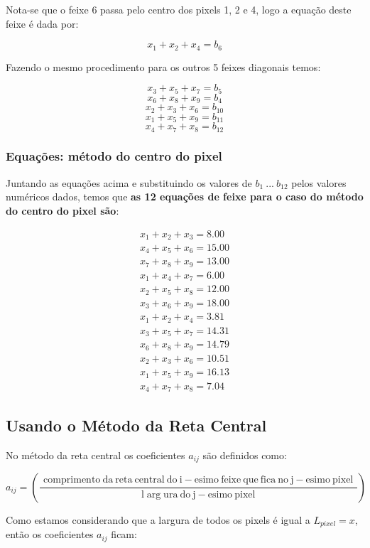 \documentclass[a4paper, 12pt]{article}
\begin{document}
Nota-se que o feixe 6 passa pelo centro dos pixels 1, 2 e 4, logo a equação deste feixe é dada por:

$$x_1+x_2+x_4=b_6$$

Fazendo o mesmo procedimento para os outros 5 feixes diagonais temos:

$$x_3+x_5+x_7=b_5$$
$$x_6+x_8+x_9=b_4$$
$$x_2+x_3+x_6=b_{10}$$
$$x_1+x_5+x_9=b_{11}$$
$$x_4+x_7+x_8=b_{12}$$


\subsubsection{Equações: método do centro do pixel}

Juntando as equações acima e substituindo os valores de $b_1\  ...\  b_{12}$ pelos valores numéricos dados, temos que \textbf{as 12 equações de feixe para o caso do método do centro do pixel são}:

$$\boxed{\ \begin{matrix}
x_1+x_2+x_3=8.00\\
x_4+x_5+x_6=15.00\\
x_7+x_8+x_9=13.00\\
x_1+x_4+x_7=6.00\\
x_2+x_5+x_8=12.00\\
x_3+x_6+x_9=18.00\\
x_1+x_2+x_4=3.81\\
x_3+x_5+x_7=14.31\\
x_6+x_8+x_9=14.79\\
x_2+x_3+x_6=10.51\\
x_1+x_5+x_9=16.13\\
x_4+x_7+x_8=7.04
\end{matrix}\ }$$


\subsection{Usando o Método da Reta Central}

No método da reta central os coeficientes $a_{ij}$ são definidos como:

$$a_{ij}=\left(\frac{\begin{matrix}
\mathrm{comprimento\ da\ reta\ central\ do\ i-esimo\ feixe}\ \mathrm{que\ fica\ no\ j-esimo\ pixel}
\end{matrix}}{\mathrm{l\arg ura\ do\ j-esimo\ pixel}}\right)$$

Como estamos considerando que a largura de todos os pixels é igual a $L_{pixel}=x$, então os coeficientes $a_{ij}$ ficam:
\end{document}
